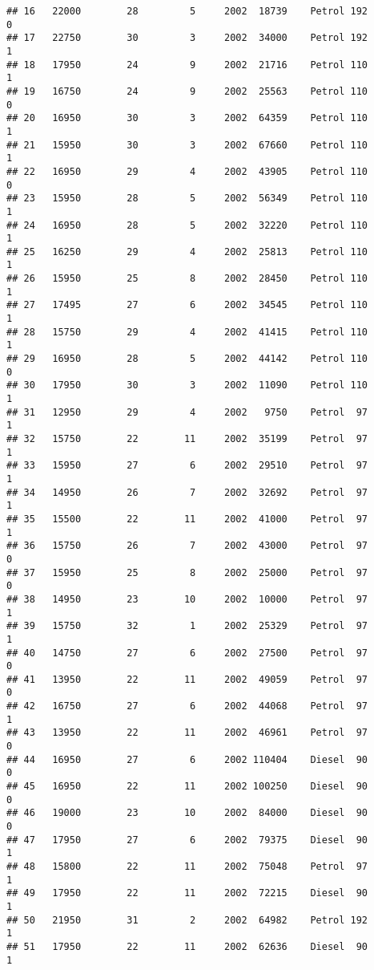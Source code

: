\documentclass[]{article}
\begin{document}
\begin{verbatim}
## 16   22000        28         5     2002  18739    Petrol 192         0
## 17   22750        30         3     2002  34000    Petrol 192         1
## 18   17950        24         9     2002  21716    Petrol 110         1
## 19   16750        24         9     2002  25563    Petrol 110         0
## 20   16950        30         3     2002  64359    Petrol 110         1
## 21   15950        30         3     2002  67660    Petrol 110         1
## 22   16950        29         4     2002  43905    Petrol 110         0
## 23   15950        28         5     2002  56349    Petrol 110         1
## 24   16950        28         5     2002  32220    Petrol 110         1
## 25   16250        29         4     2002  25813    Petrol 110         1
## 26   15950        25         8     2002  28450    Petrol 110         1
## 27   17495        27         6     2002  34545    Petrol 110         1
## 28   15750        29         4     2002  41415    Petrol 110         1
## 29   16950        28         5     2002  44142    Petrol 110         0
## 30   17950        30         3     2002  11090    Petrol 110         1
## 31   12950        29         4     2002   9750    Petrol  97         1
## 32   15750        22        11     2002  35199    Petrol  97         1
## 33   15950        27         6     2002  29510    Petrol  97         1
## 34   14950        26         7     2002  32692    Petrol  97         1
## 35   15500        22        11     2002  41000    Petrol  97         1
## 36   15750        26         7     2002  43000    Petrol  97         0
## 37   15950        25         8     2002  25000    Petrol  97         0
## 38   14950        23        10     2002  10000    Petrol  97         1
## 39   15750        32         1     2002  25329    Petrol  97         1
## 40   14750        27         6     2002  27500    Petrol  97         0
## 41   13950        22        11     2002  49059    Petrol  97         0
## 42   16750        27         6     2002  44068    Petrol  97         1
## 43   13950        22        11     2002  46961    Petrol  97         0
## 44   16950        27         6     2002 110404    Diesel  90         0
## 45   16950        22        11     2002 100250    Diesel  90         0
## 46   19000        23        10     2002  84000    Diesel  90         0
## 47   17950        27         6     2002  79375    Diesel  90         1
## 48   15800        22        11     2002  75048    Petrol  97         1
## 49   17950        22        11     2002  72215    Diesel  90         1
## 50   21950        31         2     2002  64982    Petrol 192         1
## 51   17950        22        11     2002  62636    Diesel  90         1

\end{verbatim}
\end{document}
